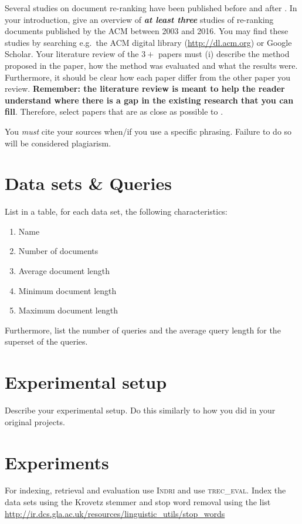 \documentclass{sig-alternate}
\begin{document}
Several studies on document re-ranking have been published before and after \cite{woo2010achieving}. In your introduction, give an overview of \textbf{\emph{at least three}} studies of re-ranking documents published by the ACM between 2003 and 2016. You may find these studies by searching e.g.\ the ACM digital library (\url{http://dl.acm.org}) or Google Scholar. Your literature review of the $3+$ papers must (i) describe the method proposed in the paper, how the method was evaluated and what the results were. Furthermore, it should be clear how each paper differ from the other paper you review. \textbf{Remember: the literature review is meant to help the reader understand where there is a gap in the existing research that you can fill}. Therefore, select papers that are as close as possible to \cite{woo2010achieving}.

You \emph{must} cite your sources when/if you use a specific phrasing. Failure to do so will be considered plagiarism.

\section{Data sets \& Queries}
List in a table, for each data set, the following characteristics:
\begin{enumerate}
\item Name
\item Number of documents
\item Average document length
\item Minimum document length
\item Maximum document length
\end{enumerate}

Furthermore, list the number of queries and the average query length for the superset of the queries.

\section{Experimental setup}
Describe your experimental setup. Do this similarly to how you did in your original projects.

\section{Experiments}
For indexing, retrieval and evaluation use \textsc{Indri} and use \textsc{trec\_eval}. Index the data sets using the Krovetz stemmer and stop word removal using the list \url{http://ir.dcs.gla.ac.uk/resources/linguistic_utils/stop_words}
\end{document}
